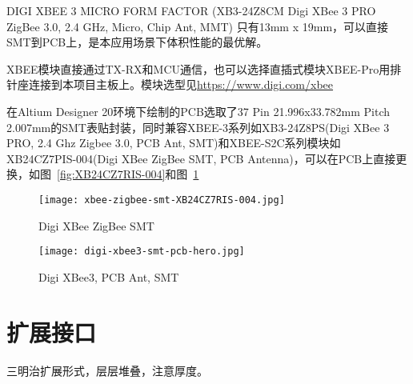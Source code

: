 DIGI XBEE 3 MICRO FORM FACTOR (XB3-24Z8CM  Digi XBee 3 PRO ZigBee 3.0, 2.4 GHz, Micro, Chip Ant, MMT) 只有13mm x 19mm，可以直接SMT到PCB上，是本应用场景下体积性能的最优解。

XBEE模块直接通过TX-RX和MCU通信，也可以选择直插式模块XBEE-Pro用排针座连接到本项目主板上。模块选型见\url{https://www.digi.com/xbee}

在Altium Designer 20环境下绘制的PCB选取了37 Pin 21.996x33.782mm Pitch 2.007mm的SMT表贴封装，同时兼容XBEE-3系列如XB3-24Z8PS(Digi XBee 3 PRO, 2.4 Ghz Zigbee 3.0, PCB Ant, SMT)和XBEE-S2C系列模块如XB24CZ7PIS-004(Digi XBee ZigBee SMT, PCB Antenna)，可以在PCB上直接更换，如图~\ref{fig:XB24CZ7RIS-004}和图~\ref{fig:xbee3}

\begin{figure}
    \begin{minipage}{0.48\textwidth}
      \centering
      \texttt{[image: xbee-zigbee-smt-XB24CZ7RIS-004.jpg]}
      \caption{Digi XBee ZigBee SMT}
      \label{fig:XB24CZ7RIS-004}
    \end{minipage}\hfill
    \begin{minipage}{0.48\textwidth}
      \centering
      \texttt{[image: digi-xbee3-smt-pcb-hero.jpg]}
      \caption{Digi XBee3, PCB Ant, SMT}
      \label{fig:xbee3}
    \end{minipage}
\end{figure}

\section{扩展接口}

三明治扩展形式，层层堆叠，注意厚度。

